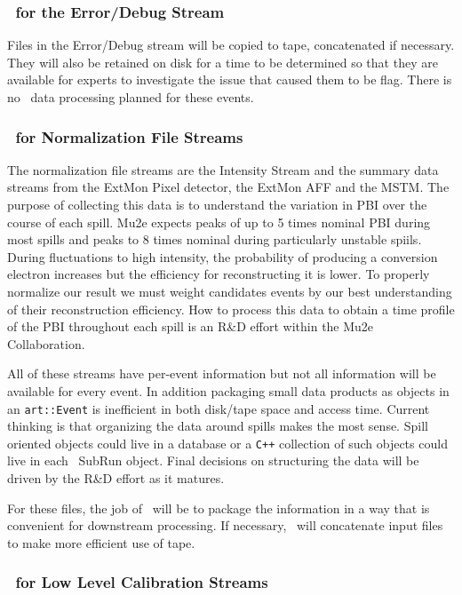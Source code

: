 \subsubsection{\passone\ for the Error/Debug Stream}
\label{ssec:pass1:errordebug}

Files in the Error/Debug stream will be copied to tape, concatenated if necessary.
They will also be retained on disk for a time to be determined so that they are available for experts to investigate the issue that caused them to be flag.
There is no \passone\ data processing planned for these events.

\subsubsection{\passone\ for Normalization File Streams}
\label{ssec:pass1:normalization}

The normalization file streams are the Intensity Stream and the summary data streams from the ExtMon Pixel detector, the ExtMon AFF and the MSTM.
The purpose of collecting this data is to understand the variation in PBI over the course of each spill.
Mu2e expects peaks of up to 5 times nominal PBI during most spills and peaks to 8 times nominal during particularly unstable spiils.
During fluctuations to high intensity, the probability of producing a conversion electron increases but the efficiency for reconstructing it is lower.
To properly normalize our result we must weight candidates events by our best understanding of their reconstruction efficiency.
How to process this data to obtain a time profile of the PBI throughout each spill is an R\&D effort within the Mu2e Collaboration. 

All of these streams have per-event information but not all information will be available for every event.
In addition packaging small data products as objects in an {\tt art::Event} is inefficient in both disk/tape space and access time.
Current thinking is that organizing the data around spills makes the most sense.
Spill oriented objects could live in a database or a {\tt C++} collection of such objects could live in each \art\ SubRun object.  
Final decisions on structuring the data will be driven by the R\&D effort as it matures.

For these files, the job of \passone\ will be to package the information in a way that is convenient for downstream processing.
If necessary, \passone\ will concatenate input files to make more efficient use of tape.

\subsubsection{\passone\ for Low Level Calibration Streams}
\label{ssec:pass1:lowlevelcal}

